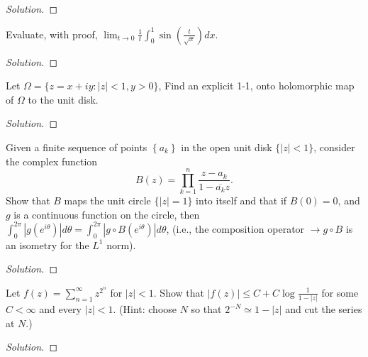 \documentclass[10pt]{article}
\newenvironment{soln}{\begin{proof}[Solution]}{\end{proof}}
\begin{document}
\begin{soln}

\end{soln}



\begin{problem}
[2001 A-I-2]
Evaluate, with proof, $\lim _{t \rightarrow 0} \frac{1}{t} \int_0^1 \sin \left(\frac{t}{\sqrt{x}}\right) d x$.
\end{problem}

\begin{soln}

\end{soln}



\begin{problem}
[2001 A-I-5]
Let $\Omega=\{z=x+i y:|z|<1, y>0\}$, Find an explicit 1-1, onto holomorphic map of $\Omega$ to the unit disk.
\end{problem}

\begin{soln}

\end{soln}



\begin{problem}
[2001 A-II-5]
Given a finite sequence of points $\left\{a_k\right\}$ in the open unit disk $\{|z|<1\}$, consider the complex function
$$
B(z)=\prod_{k=1}^n \frac{z-a_k}{1-\overline{a_k} z} .
$$
Show that $B$ maps the unit circle $\{|z|=1\}$ into itself and that if $B(0)=0$, and $g$ is a continuous function on the circle, then $\int_0^{2 \pi}\left|g\left(e^{i \theta}\right)\right| d \theta=\int_0^{2 \pi}\left|g \circ B\left(e^{i \theta}\right)\right| d \theta$, (i.e., the composition operator $\rightarrow g \circ B$ is an isometry for the $L^1$ norm).
\end{problem}

\begin{soln}

\end{soln}



\begin{problem}
[2000 J-I-4]
Let $f(z)=\sum_{n=1}^{\infty} z^{2^n}$ for $|z|<1$. Show that $|f(z)| \leq C+C \log \frac{1}{1-|z|}$ for some $C<\infty$ and every $|z|<1$. (Hint: choose $N$ so that $2^{-N} \simeq 1-|z|$ and cut the series at $N$.)
\end{problem}

\begin{soln}

\end{soln}
\end{document}
